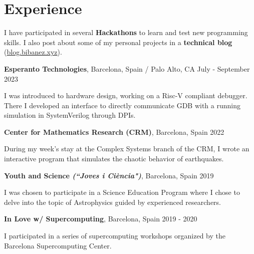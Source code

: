 \section{Experience}

I have participated in several \textbf{Hackathons} to learn and test new programming skills.
I also post about some of my personal projects in a \textbf{technical blog} (\href{https://blog.bibanez.xyz}{blog.bibanez.xyz}).

\vspace{4pt}

\setlength{\leftskip}{0pt}
\normalsize \setlength{\parindent}{0pt}
\textbf{Esperanto Technologies}, Barcelona, Spain / Palo Alto, CA \hfill July - September 2023

\setlength{\leftskip}{2em} \setlength{\parindent}{0pt}
\small I was introduced to hardware design, working on a Risc-V compliant debugger. 
There I developed an interface to directly communicate GDB with a running simulation in SystemVerilog through DPIs.

\setlength{\leftskip}{0pt}
\normalsize \setlength{\parindent}{0pt}
\textbf{Center for Mathematics Research (CRM)}, Barcelona, Spain \hfill 2022

\setlength{\leftskip}{2em} \setlength{\parindent}{0pt}
\small During my week's stay at the Complex Systems branch of the CRM, I wrote an interactive program that simulates the chaotic behavior of earthquakes.


\setlength{\leftskip}{0pt}
\normalsize \setlength{\parindent}{0pt}
\textbf{Youth and Science \textit{(``Joves i Ciència")}}, Barcelona, Spain \hfill 2019

\setlength{\leftskip}{2em} \setlength{\parindent}{0pt}
\small I was chosen to participate in a Science Education Program where I chose to delve into the topic of Astrophysics guided by experienced researchers.

\setlength{\leftskip}{0pt}
\normalsize \setlength{\parindent}{0pt}
\textbf{In Love w/ Supercomputing}, Barcelona, Spain \hfill 2019 - 2020

\setlength{\leftskip}{2em} \setlength{\parindent}{0pt}
\small I participated in a series of supercomputing workshops organized by the Barcelona Supercomputing Center.

\normalsize
\setlength{\leftskip}{0pt}
